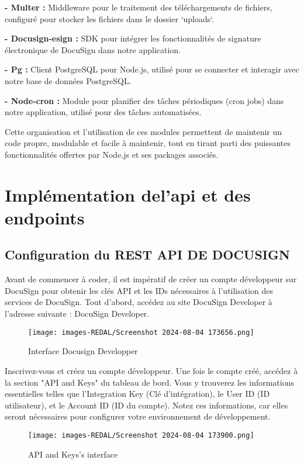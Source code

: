 \textbf{- Multer :} Middleware pour le traitement des téléchargements de fichiers, configuré pour stocker les fichiers dans le dossier `uploads`.



\textbf{- Docusign-esign :} SDK pour intégrer les fonctionnalités de signature électronique de DocuSign dans notre application.


\textbf{- Pg :} Client PostgreSQL pour Node.js, utilisé pour se connecter et interagir avec notre base de données PostgreSQL.




\textbf{- Node-cron :} Module pour planifier des tâches périodiques (cron jobs) dans notre application, utilisé pour des tâches automatisées.


Cette organisation et l'utilisation de ces modules permettent de maintenir un code propre, modulable et facile à maintenir, tout en tirant parti des puissantes fonctionnalités offertes par Node.js et ses packages associés.
















\section{Implémentation del'api et des endpoints}
\subsection{Configuration du REST API DE DOCUSIGN}
Avant de commencer à coder, il est impératif de créer un compte développeur sur DocuSign pour obtenir les clés API et les IDs nécessaires à l'utilisation des services de DocuSign. Tout d'abord, accédez au site DocuSign Developer à l'adresse suivante : DocuSign Developer. 

\begin{figure}[H]
\begin{center}
\texttt{[image: images-REDAL/Screenshot 2024-08-04 173656.png]}
\end{center}
\caption{Interface Docusign Developper}
\end{figure}







Inscrivez-vous et créez un compte développeur. Une fois le compte créé, accédez à la section "API and Keys" du tableau de bord. Vous y trouverez les informations essentielles telles que l'Integration Key (Clé d'intégration), le User ID (ID utilisateur), et le Account ID (ID du compte). Notez ces informations, car elles seront nécessaires pour configurer votre environnement de développement.
\begin{figure}[H]
\begin{center}
\texttt{[image: images-REDAL/Screenshot 2024-08-04 173900.png]}
\end{center}
\caption{API and Keys's interface}
\end{figure}




